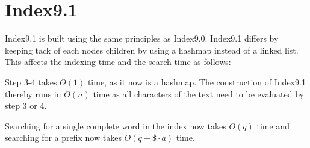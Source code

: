 \section{Index9.1}\label{sec:index9.1}
Index9.1 is built using the same principles as Index9.0. Index9.1 differs by keeping tack of each nodes children by using a hashmap instead of a linked list. This affects the indexing time and the search time as follows:

Step 3-4 takes $O(1)$ time, as it now is a hashmap. The construction of Index9.1 thereby runs in $\Theta(n)$ time as all characters of the text need to be evaluated by step 3 or 4.

Searching for a single complete word in the index now takes $O(q)$ time and searching for a prefix now takes  $O(q + \$\cdot a)$ time.

